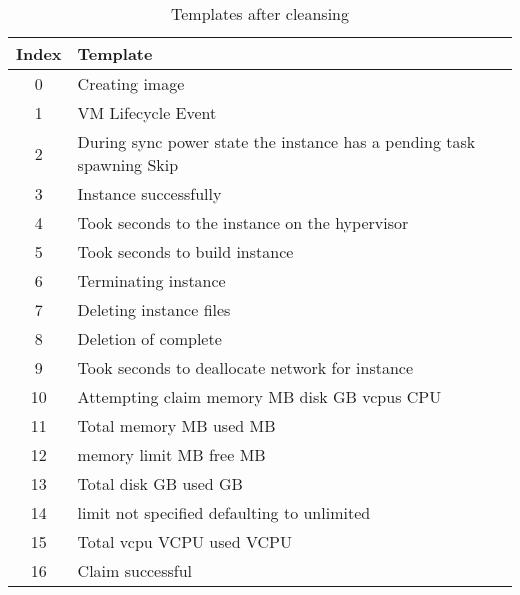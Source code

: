 \begin{table}[ht]
\begin{small}
\centering
\begin{tabular}{ c l } 
\toprule
Index & Template \\
\midrule
0 & Creating image\\
1 & VM  Lifecycle Event\\
2 & During sync power state the instance has a pending task spawning Skip\\
3 & Instance  successfully\\
4 & Took  seconds to  the instance on the hypervisor\\
5 & Took  seconds to build instance\\
6 & Terminating instance\\
7 & Deleting instance files\\
8 & Deletion of complete\\
9 & Took  seconds to deallocate network for instance\\
10 & Attempting claim memory  MB disk  GB vcpus  CPU\\
11 & Total memory  MB used  MB\\
12 & memory limit  MB free  MB\\
13 & Total disk  GB used  GB\\
14 & limit not specified defaulting to unlimited\\
15 & Total vcpu  VCPU used  VCPU\\
16 & Claim successful\\
\bottomrule
\end{tabular}
\caption{Templates after cleansing}
\label{tab:templates_after_cleansing}
\end{small}
\end{table}

\clearpage

